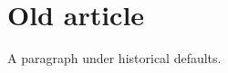 \documentclass[lang=en]{impeart}
\begin{document}
\section{Old article}
A paragraph under historical defaults.
\end{document}
